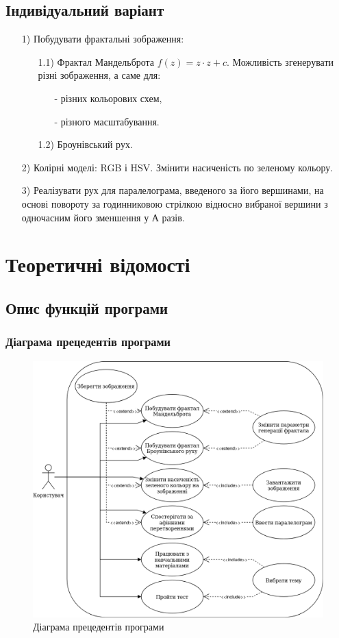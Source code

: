 \documentclass[oneside,14pt]{extarticle}
\begin{document}
\begin{normalsize}
	\subsection{Індивідуальний варіант}
	\begin{enumerate}
		\item[1)] Побудувати фрактальні зображення: \begin{enumerate}
			\item[1.1)] Фрактал Мандельброта $f(z)=z\cdot z+c$. Можливість згенерувати різні
			зображення, а саме для: \begin{enumerate}
				\item[-] різних кольорових схем,
				\item[-] різного масштабування.
			\end{enumerate}
			\item[1.2)] Броунівський рух.
		\end{enumerate}
		\item[2)] Колірні моделі: RGB і HSV. Змінити насиченість по зеленому кольору.
		\item[3)] Реалізувати рух для паралелограма, введеного за його вершинами, на основі
		повороту за годинниковою стрілкою відносно вибраної вершини з одночасним його
		зменшення у А разів.
	\end{enumerate}

	\section{Теоретичні відомості}
	\subsection{Опис функцій програми}
	\subsubsection{Діаграма прецедентів програми}
	\begin{figure}[H]
		\centering
		\includegraphics[scale=0.43]{d.drawio}
		\caption{Діаграма прецедентів програми}
	\end{figure}
	

\end{normalsize}
\end{document}
